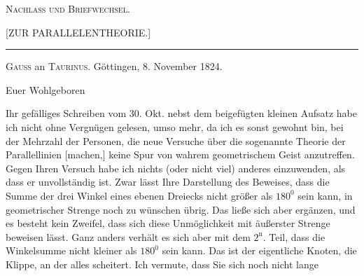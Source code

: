 \clearpage{}
\begin{center}
{\Large\textsc{Nachlass und Briefwechsel.}}
\end{center}

\bigskip
\begin{center}[ZUR PARALLELENTHEORIE.]\end{center}
\begin{center}\rule{2.5cm}{0.4pt}\end{center}

\begin{center}
\textsc{Gauss} an \textsc{Taurinus}. Göttingen, 8. November 1824.
\end{center}

\begin{center}Euer Wohlgeboren\end{center}

Ihr gefälliges Schreiben vom 30. Okt. nebst dem beigefügten kleinen Aufsatz habe ich nicht ohne
Vergnügen gelesen, umso mehr, da ich es sonst gewohnt bin, bei der Mehrzahl der Personen, die
neue Versuche über die sogenannte Theorie der Parallellinien [machen,] keine Spur von
wahrem geometrischem Geist anzutreffen. Gegen Ihren Versuch habe ich nichts (oder nicht viel)
anderes einzuwenden, als dass er unvollständig ist. Zwar lässt Ihre Darstellung des Beweises,
dass die Summe der drei Winkel eines ebenen Dreiecks nicht größer als $180^{0}$ sein kann,
in geometrischer Strenge noch zu wünschen übrig. Das ließe sich aber ergänzen,
und es besteht kein Zweifel, dass sich diese Unmöglichkeit mit äußerster
Strenge beweisen lässt. Ganz anders verhält es sich aber mit dem $2^{\mathrm n}.$ Teil,
dass die Winkelsumme nicht kleiner als $180^{0}$ sein kann. Das ist der eigentliche
Knoten, die Klippe, an der alles scheitert. Ich vermute, dass Sie sich noch nicht lange
